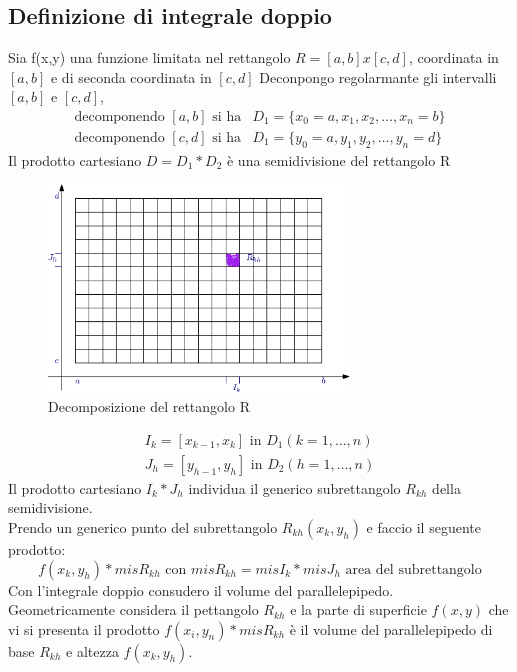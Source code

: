 \subsection{Definizione di integrale doppio}
\begin{defi}
  Sia f(x,y) una funzione limitata nel rettangolo $R=[a,b]x[c,d]$, coordinata in $[a,b]$ e
  di seconda coordinata in $[c,d]$
  Deconpongo regolarmante gli intervalli $[a,b]$ e $[c,d]$,
  \begin{equation*}
    \begin{matrix}
        \text{decomponendo }[a,b]\text{ si ha} & D_1=\{x_0=a,x_1,x_2,\dots,x_n=b\}\\ 
        \text{decomponendo }[c,d]\text{ si ha} & D_1=\{y_0=a,y_1,y_2,\dots,y_n=d\}
    \end{matrix}
  \end{equation*}
  Il prodotto cartesiano $D=D_1*D_2$ è una semidivisione del rettangolo R
  \begin{figure}[ht]
    \centering
    \includegraphics[width=8cm]{img/finiti/graficodecomposizioneR.eps}
    \caption{Decomposizione del rettangolo R}
  \end{figure}
  \begin{equation*}
    \begin{matrix}
        I_k=[x_{k-1},x_k] \text{ in } D_1 (k=1,\dots,n)\\
        J_h=[y_{h-1},y_h] \text{ in } D_2 (h=1,\dots,n)
    \end{matrix}
  \end{equation*}
  Il prodotto cartesiano $I_k*J_h$ individua il generico subrettangolo $R_{kh}$ della semidivisione.\\
  Prendo un generico punto del subrettangolo $R_{kh}(x_k,y_h)$ e faccio il seguente prodotto:
  \begin{equation*}
    f(x_k,y_h)*mis R_{kh} \text{ con } misR_{kh} = misI_k * misJ_h \text{ area del subrettangolo}
  \end{equation*}
  Con l'integrale doppio consudero il volume del parallelepipedo.\\
  Geometricamente considera il pettangolo $R_{kh}$ e la parte di superficie $f(x,y)$ che vi si
  presenta il prodotto $f(x_i,y_n)*mis R_{kh}$ è il volume del parallelepipedo di base $R_{kh}$
  e altezza $f(x_k,y_h)$.
\end{defi}
